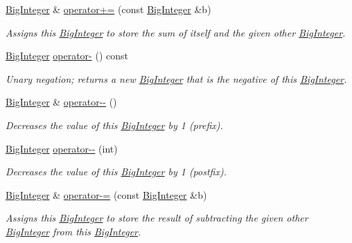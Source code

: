 \begin{DoxyCompactItemize}
\mbox{\hyperlink{classBigInteger}{Big\+Integer}} \& \mbox{\hyperlink{classBigInteger_ad49a68a043125f9c46eb93122277f86f}{operator+=}} (const \mbox{\hyperlink{classBigInteger}{Big\+Integer}} \&b)
\begin{DoxyCompactList}\small\item\em Assigns this \mbox{\hyperlink{classBigInteger}{Big\+Integer}} to store the sum of itself and the given other \mbox{\hyperlink{classBigInteger}{Big\+Integer}}. \end{DoxyCompactList}\item 
\mbox{\hyperlink{classBigInteger}{Big\+Integer}} \mbox{\hyperlink{classBigInteger_afdae548140cb672a33a3c6bf402ea613}{operator-\/}} () const
\begin{DoxyCompactList}\small\item\em Unary negation; returns a new \mbox{\hyperlink{classBigInteger}{Big\+Integer}} that is the negative of this \mbox{\hyperlink{classBigInteger}{Big\+Integer}}. \end{DoxyCompactList}\item 
\mbox{\hyperlink{classBigInteger}{Big\+Integer}} \& \mbox{\hyperlink{classBigInteger_a8cc5faea7f6f011fbba6cbf31d55a1dd}{operator-\/-\/}} ()
\begin{DoxyCompactList}\small\item\em Decreases the value of this \mbox{\hyperlink{classBigInteger}{Big\+Integer}} by 1 (prefix). \end{DoxyCompactList}\item 
\mbox{\hyperlink{classBigInteger}{Big\+Integer}} \mbox{\hyperlink{classBigInteger_ac74beb1a11a5ad6ab210b8c9101451c8}{operator-\/-\/}} (int)
\begin{DoxyCompactList}\small\item\em Decreases the value of this \mbox{\hyperlink{classBigInteger}{Big\+Integer}} by 1 (postfix). \end{DoxyCompactList}\item 
\mbox{\hyperlink{classBigInteger}{Big\+Integer}} \& \mbox{\hyperlink{classBigInteger_a2384a7b6f8db40412a81c7bf584e0819}{operator-\/=}} (const \mbox{\hyperlink{classBigInteger}{Big\+Integer}} \&b)
\begin{DoxyCompactList}\small\item\em Assigns this \mbox{\hyperlink{classBigInteger}{Big\+Integer}} to store the result of subtracting the given other \mbox{\hyperlink{classBigInteger}{Big\+Integer}} from this \mbox{\hyperlink{classBigInteger}{Big\+Integer}}. \end{DoxyCompactList}\item 

\end{DoxyCompactItemize}
